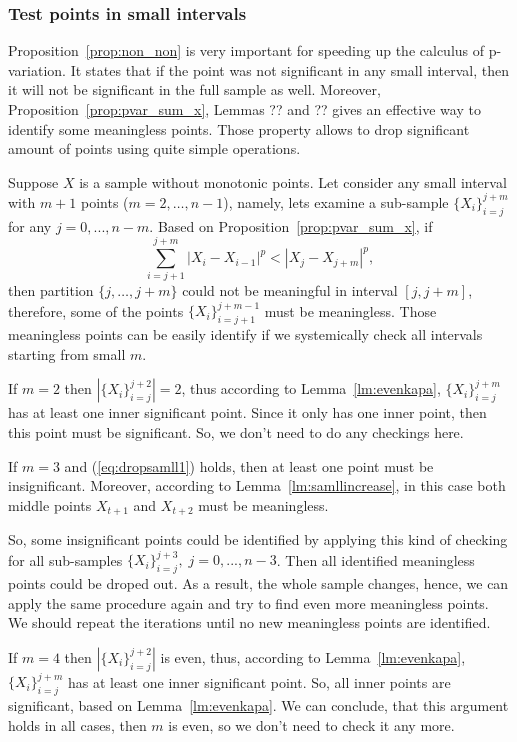 \documentclass[12pt, a4paper]{article}
\numberwithin{equation}{section}
\begin{document}
\subsubsection{Test points in small intervals}


Proposition~\ref{prop:non_non} is very important for speeding up the calculus of p-variation. It states that if the point was not significant in any small interval, then it will not be significant in the full sample as well. Moreover, Proposition~\ref{prop:pvar_sum_x}, Lemmas ?? and ?? gives an effective 
way to identify some meaningless points.  
Those property allows to drop significant amount of points using quite simple operations.

Suppose $X$ is a sample without monotonic points. 
Let consider any small interval with $m+1$ points ($m=2,\dots,n-1$), 
namely, lets examine a sub-sample 
$\{X_{i}\}_{i=j}^{j+m}$
for any $j=0,...,n-m$.
Based on Proposition~\ref{prop:pvar_sum_x}, if 
\begin{equation}\label{eq:dropsamll1}
  \sum_{i=j+1}^{j+m} |X_{i}-X_{i-1}|^p < |X_j-X_{j+m}|^p,
\end{equation}
then partition $\{j,\dots,j+m\}$ could not be meaningful in interval
$[j,j+m]$, therefore, some of the points $\{X_{i}\}_{i=j+1}^{j+m-1}$
must be meaningless. Those meaningless points can be easily identify 
if we systemically check all intervals starting from small $m$.

If $m=2$ then $|\{X_{i}\}_{i=j}^{j+2}|=2$, thus according to
Lemma~\ref{lm:evenkapa}, $\{X_{i}\}_{i=j}^{j+m}$ has at least one
inner significant point. Since it only has one inner point, then this point must be significant. So, we don't need to do any checkings here.

If $m=3$ and (\ref{eq:dropsamll1}) holds,
then at least one 
point must be insignificant. 
Moreover, according to Lemma~\ref{lm:samllincrease}, 
in this case both middle points $X_{t+1}$ and $X_{t+2}$ 
must be meaningless. 

So, some insignificant points could be identified by 
applying this kind of checking for all sub-samples
$\{X_{i}\}_{i=j}^{j+3},\;j=0,...,n-3$. 
Then all identified meaningless points 
could be droped out.
As a result, the whole sample changes,  
hence, 
we can apply the same procedure again and try to find 
even more meaningless points. 
We should repeat the iterations 
until no new meaningless points are 
identified.

If $m=4$ then $|\{X_{i}\}_{i=j}^{j+2}|$ is even, 
thus, according to Lemma~\ref{lm:evenkapa}, 
$\{X_{i}\}_{i=j}^{j+m}$ has at least one
inner significant point. So, all inner points are significant, 
based on Lemma~\ref{lm:evenkapa}. We can conclude, that 
this argument holds in all cases, then $m$ is even, so 
we don't need to check it any more.
\end{document}
